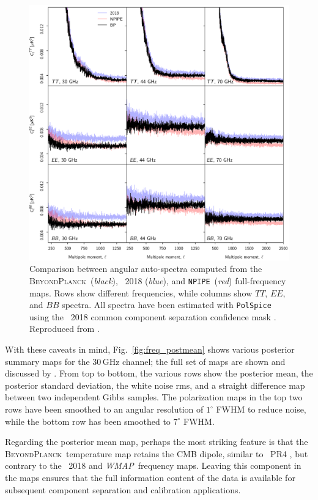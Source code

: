 \documentclass[onecolumn]{aa}
\def\WMAP{\emph{WMAP}}
\newcommand{\BP}{\textsc{BeyondPlanck}}
\newcommand{\npipe}[0]{\texttt{NPIPE}}
\begin{document}
\begin{figure}[t]
  \center
  \includegraphics[width=0.8\linewidth]{figs/cls_bp_npipe_dpc_zoom_BP10.pdf}
  \caption{Comparison between angular auto-spectra computed from the \BP\
    (\emph{black}), \Planck\ 2018 (\emph{blue}), and \npipe\ (\emph{red})
    full-frequency maps. Rows show different frequencies, while columns show
    $TT$, $EE$, and $BB$ spectra. All spectra have been estimated with
    \texttt{PolSpice} using the \Planck\ 2018 common component separation confidence mask \citep{planck2016-l04}. Reproduced from \citet{bp10}. \label{fig:powspec_full}}
\end{figure}

With these caveats in mind, Fig.~\ref{fig:freq_postmean} shows various
posterior summary maps for the 30\,GHz channel; the full set of maps
are shown and discussed by \citet{bp10}. From top to bottom, the
various rows show the posterior mean, the posterior standard
deviation, the white noise rms, and a straight difference map between
two independent Gibbs samples. The polarization maps in the top two
rows have been smoothed to an angular resolution of $1^{\circ}$ FWHM
to reduce noise, while the bottom row has been smoothed to $7^{\circ}$
FWHM.

Regarding the posterior mean map, perhaps the most striking feature is
that the \BP\ temperature map retains the CMB dipole, similar to
\Planck\ PR4 \citet{planck2020-LVII}, but contrary to the
\Planck\ 2018 and \WMAP\ frequency maps. Leaving this component in the
maps ensures that the full information content of the data is
available for subsequent component separation and calibration
applications.
\end{document}
